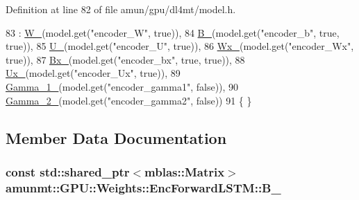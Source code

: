 Definition at line 82 of file amun/gpu/dl4mt/model.\+h.


\begin{DoxyCode}
83     : \hyperlink{structamunmt_1_1GPU_1_1Weights_1_1EncForwardLSTM_ae060a7cccb84159acd1a04a942c1807c}{W\_}(model.get(\textcolor{stringliteral}{"encoder\_W"}, \textcolor{keyword}{true})),
84       \hyperlink{structamunmt_1_1GPU_1_1Weights_1_1EncForwardLSTM_a7062db68e4903b2a3417dae5ce5c7ed5}{B\_}(model.get(\textcolor{stringliteral}{"encoder\_b"}, \textcolor{keyword}{true}, \textcolor{keyword}{true})),
85       \hyperlink{structamunmt_1_1GPU_1_1Weights_1_1EncForwardLSTM_adb63ed5dfd9130e558d4b3fd0db233a5}{U\_}(model.get(\textcolor{stringliteral}{"encoder\_U"}, \textcolor{keyword}{true})),
86       \hyperlink{structamunmt_1_1GPU_1_1Weights_1_1EncForwardLSTM_acc24fe4656b768fb6368165cb0922e5e}{Wx\_}(model.get(\textcolor{stringliteral}{"encoder\_Wx"}, \textcolor{keyword}{true})),
87       \hyperlink{structamunmt_1_1GPU_1_1Weights_1_1EncForwardLSTM_a112f4277841518dfef867f93aa0df0d1}{Bx\_}(model.get(\textcolor{stringliteral}{"encoder\_bx"}, \textcolor{keyword}{true}, \textcolor{keyword}{true})),
88       \hyperlink{structamunmt_1_1GPU_1_1Weights_1_1EncForwardLSTM_a82da9f93bccbbec2b8a60e7790605c33}{Ux\_}(model.get(\textcolor{stringliteral}{"encoder\_Ux"}, \textcolor{keyword}{true})),
89       \hyperlink{structamunmt_1_1GPU_1_1Weights_1_1EncForwardLSTM_ad2956f042114b0799d0e7a4284e8346e}{Gamma\_1\_}(model.get(\textcolor{stringliteral}{"encoder\_gamma1"}, \textcolor{keyword}{false})),
90       \hyperlink{structamunmt_1_1GPU_1_1Weights_1_1EncForwardLSTM_a59693507f93ca5e40e1ee660a84de31d}{Gamma\_2\_}(model.get(\textcolor{stringliteral}{"encoder\_gamma2"}, \textcolor{keyword}{false}))
91     \{ \}
\end{DoxyCode}


\subsection{Member Data Documentation}
\subsubsection[{\texorpdfstring{B\+\_\+}{B_}}]{\setlength{\rightskip}{0pt plus 5cm}const std\+::shared\+\_\+ptr$<${\bf mblas\+::\+Matrix}$>$ amunmt\+::\+G\+P\+U\+::\+Weights\+::\+Enc\+Forward\+L\+S\+T\+M\+::\+B\+\_\+}\hypertarget{structamunmt_1_1GPU_1_1Weights_1_1EncForwardLSTM_a7062db68e4903b2a3417dae5ce5c7ed5}{}\label{structamunmt_1_1GPU_1_1Weights_1_1EncForwardLSTM_a7062db68e4903b2a3417dae5ce5c7ed5}


